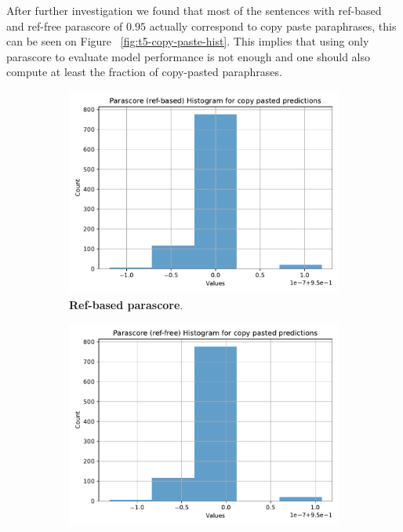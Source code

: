 \documentclass[fleqn,moreauthors,10pt]{ds_report}
\begin{document}
After further investigation we found that most of the sentences with ref-based and ref-free parascore of $0.95$ actually correspond to copy paste paraphrases, this can be seen on Figure ~\ref{fig:t5-copy-paste-hist}. This implies that using only parascore to evaluate model performance is not enough and one should also compute at least the fraction of copy-pasted paraphrases.

\begin{figure}[ht]
    \centering
    \begin{subfigure}{0.45\linewidth} %
        \centering
        \includegraphics[width=\textwidth]{report/fig/t5-base-copy-preds-parascore-ref-based-hist.pdf}
        \caption{\textbf{Ref-based parascore}.}
        \label{fig:t5-aug-parascore-ref-based-hist}
    \end{subfigure}
    \hfill %
    \begin{subfigure}{0.45\linewidth} %
        \centering
        \includegraphics[width=\textwidth]{report/fig/t5-base-copy-preds-parascore-ref-free-hist.pdf}

\end{subfigure}
\end{figure}
\end{document}
